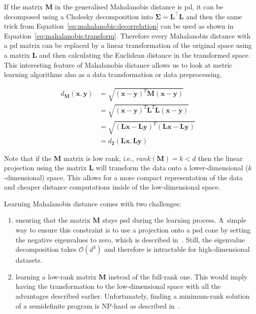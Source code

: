 \documentclass[12pt,a4paper]{report}
\begin{document}
If the matrix $\bm{M}$ in the generalised Mahalanobis distance is \ac{pd}, it can be decomposed using a Cholesky decomposition into $\bm{\Sigma}=\bm{L}^\top\bm{L}$ and then the same trick from Equation~\ref{eq:mahalanobis:decorrelation} can be used as shown in Equation~\ref{eq:mahalanobis:transform}. Therefore every Mahalanobis distance with a \ac{pd} matrix can be replaced by a linear transformation of the original space using a matrix $\bm{L}$ and then calculating the Euclidean distance in the transformed space. This interesting feature of Mahalanobis distance allows us to look at metric learning algorithms also as a data transformation or data preprocessing.

\begin{align}
  d_{\bm{M}}(\textbf{x},\textbf{y}) &= \sqrt{(\textbf{x}-\textbf{y})^{T}\bm{M}(\textbf{x}-\textbf{y})} \nonumber\\
         &= \sqrt{(\textbf{x}-\textbf{y})^{T}\bm{L}^{T}\bm{L}(\textbf{x}-\textbf{y})} \nonumber\\
         &= \sqrt{(\bm{L}\textbf{x}-\bm{L}\textbf{y})^{T}(\bm{L}\textbf{x}-\bm{L}\textbf{y})} \nonumber\\
         &= d_{\bm{2}}(\bm{L}\textbf{x}, \bm{L}\textbf{y}) \label{eq:mahalanobis:transform}
\end{align}

Note that if the $\bm{M}$ matrix is low rank, i.e., $rank(\bm{M})=k<d$ then the linear projection using the matrix $\bm{L}$ will transform the data onto a lower-dimensional ($k$-dimensional) space. This allows for a more compact representation of the data and cheaper distance computations inside of the low-dimensional space.

Learning Mahalanobis distance comes with two challenges:
\begin{enumerate}
\item ensuring that the matrix $\bm{M}$ stays \ac{psd} during the learning process. A~simple way to ensure this constraint is to use a projection onto a \ac{psd} cone by setting the negative eigenvalues to zero, which is described in~\citep{qian2015efficient}. Still, the eigenvalue decomposition takes $\mathcal{O}(d^3)$ and therefore is intractable for high-dimensional datasets.
\item learning a low-rank matrix $\bm{M}$ instead of the full-rank one. This would imply having the transformation to the low-dimensional space with all the advantages described earlier. Unfortunately, finding a minimum-rank solution of a semidefinite program is NP-hard as described in~\citep{lemon2016low}.
\end{enumerate}
\end{document}
